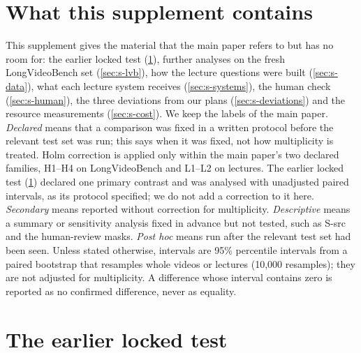 \section*{What this supplement contains}
This supplement gives the material that the main paper refers to but has no room for: the earlier locked test (\cref{sec:s-earlier}), further analyses on the fresh LongVideoBench set (\cref{sec:s-lvb}), how the lecture questions were built (\cref{sec:s-data}), what each lecture system receives (\cref{sec:s-systems}), the human check (\cref{sec:s-human}), the three deviations from our plans (\cref{sec:s-deviations}) and the resource measurements (\cref{sec:s-cost}).
We keep the labels of the main paper.
\emph{Declared} means that a comparison was fixed in a written protocol before the relevant test set was run; this says when it was fixed, not how multiplicity is treated.
Holm correction is applied only within the main paper's two declared families, H1--H4 on LongVideoBench and L1--L2 on lectures.
The earlier locked test (\cref{sec:s-earlier}) declared one primary contrast and was analysed with unadjusted paired intervals, as its protocol specified; we do not add a correction to it here.
\emph{Secondary} means reported without correction for multiplicity.
\emph{Descriptive} means a summary or sensitivity analysis fixed in advance but not tested, such as S-src and the human-review masks.
\emph{Post hoc} means run after the relevant test set had been seen.
Unless stated otherwise, intervals are 95\% percentile intervals from a paired bootstrap that resamples whole videos or lectures (10,000 resamples); they are not adjusted for multiplicity.
A difference whose interval contains zero is reported as no confirmed difference, never as equality.

\section{The earlier locked test}
\label{sec:s-earlier}

